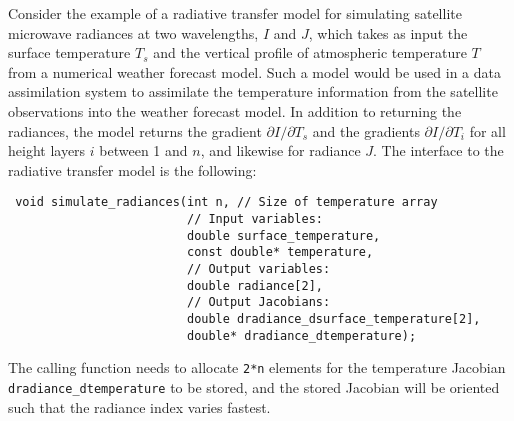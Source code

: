 \documentclass[a4,oneside]{book}
\def\codesize{\small}
\def\code#1{{\codesize\texttt{#1}}}
\begin{document}
Consider the example of a radiative transfer model for simulating
satellite microwave radiances at two wavelengths, $I$ and $J$, which
takes as input the surface temperature $T_s$ and the vertical profile
of atmospheric temperature $T$ from a numerical weather forecast
model. Such a model would be used in a data assimilation system to
assimilate the temperature information from the satellite observations
into the weather forecast model. In addition to returning the
radiances, the model returns the gradient $\partial I/\partial T_s$
and the gradients $\partial I/\partial T_i$ for all height layers $i$
between 1 and $n$, and likewise for radiance $J$. The interface to the
radiative transfer model is the following:
%
\begin{lstlisting}
 void simulate_radiances(int n, // Size of temperature array
                         // Input variables:
                         double surface_temperature, 
                         const double* temperature,
                         // Output variables:
                         double radiance[2],
                         // Output Jacobians:
                         double dradiance_dsurface_temperature[2],
                         double* dradiance_dtemperature);
\end{lstlisting}
%
The calling function needs to allocate \code{2*n} elements for the
temperature Jacobian \code{dradiance\_dtemperature} to be stored, and
the stored Jacobian will be oriented such that the radiance index
varies fastest.
\end{document}
